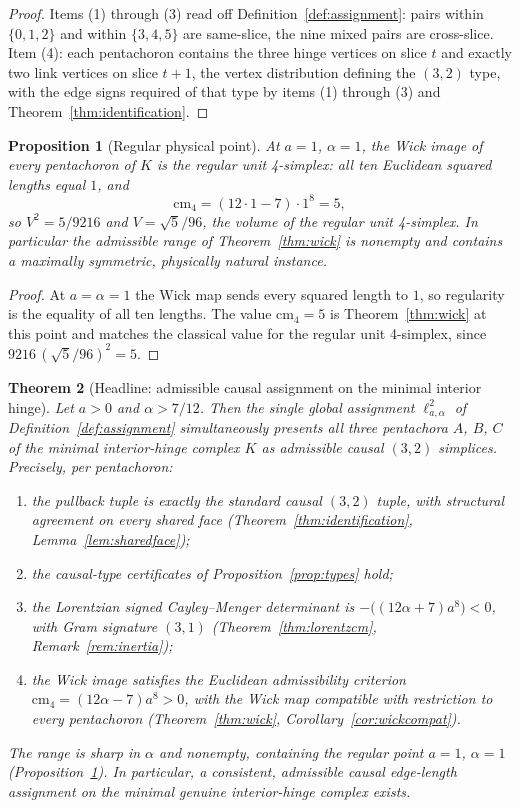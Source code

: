 \documentclass[11pt]{article}
\newtheorem{theorem}{Theorem}[section]
\newtheorem{proposition}[theorem]{Proposition}
\theoremstyle{definition}
\theoremstyle{remark}
\newcommand{\cm}{\mathrm{cm}_{4}}
\newcommand{\Kmin}{K}
\newcommand{\ltwo}{\ell^{2}_{a,\alpha}}
\begin{document}
\begin{proof}
Items (1) through (3) read off Definition~\ref{def:assignment}: pairs within $\{0,1,2\}$ and within $\{3,4,5\}$ are same-slice, the nine mixed pairs are cross-slice. Item (4): each pentachoron contains the three hinge vertices on slice $t$ and exactly two link vertices on slice $t+1$, the vertex distribution defining the $(3,2)$ type, with the edge signs required of that type by items (1) through (3) and Theorem~\ref{thm:identification}.
\end{proof}

\begin{proposition}[Regular physical point]
\label{prop:regular}
At $a=1$, $\alpha=1$, the Wick image of every pentachoron of $\Kmin$ is the regular unit 4-simplex: all ten Euclidean squared lengths equal $1$, and
\[
\cm=(12\cdot 1-7)\cdot 1^{8}=5,
\]
so $V^{2}=5/9216$ and $V=\sqrt{5}/96$, the volume of the regular unit 4-simplex. In particular the admissible range of Theorem~\ref{thm:wick} is nonempty and contains a maximally symmetric, physically natural instance.
\end{proposition}

\begin{proof}
At $a=\alpha=1$ the Wick map sends every squared length to $1$, so regularity is the equality of all ten lengths. The value $\cm=5$ is Theorem~\ref{thm:wick} at this point and matches the classical value for the regular unit 4-simplex, since $9216\,(\sqrt5/96)^{2}=5$.
\end{proof}

\begin{theorem}[Headline: admissible causal assignment on the minimal interior hinge]
\label{thm:headline}
Let $a>0$ and $\alpha>7/12$. Then the single global assignment $\ltwo$ of Definition~\ref{def:assignment} simultaneously presents all three pentachora $A$, $B$, $C$ of the minimal interior-hinge complex $\Kmin$ as admissible causal $(3,2)$ simplices. Precisely, per pentachoron:
\begin{enumerate}
\item the pullback tuple is exactly the standard causal $(3,2)$ tuple, with structural agreement on every shared face (Theorem~\ref{thm:identification}, Lemma~\ref{lem:sharedface});
\item the causal-type certificates of Proposition~\ref{prop:types} hold;
\item the Lorentzian signed Cayley--Menger determinant is $-\bigl((12\alpha+7)a^{8}\bigr)<0$, with Gram signature $(3,1)$ (Theorem~\ref{thm:lorentzcm}, Remark~\ref{rem:inertia});
\item the Wick image satisfies the Euclidean admissibility criterion $\cm=(12\alpha-7)a^{8}>0$, with the Wick map compatible with restriction to every pentachoron (Theorem~\ref{thm:wick}, Corollary~\ref{cor:wickcompat}).
\end{enumerate}
The range is sharp in $\alpha$ and nonempty, containing the regular point $a=1$, $\alpha=1$ (Proposition~\ref{prop:regular}). In particular, a consistent, admissible causal edge-length assignment on the minimal genuine interior-hinge complex exists.
\end{theorem}
\end{document}

